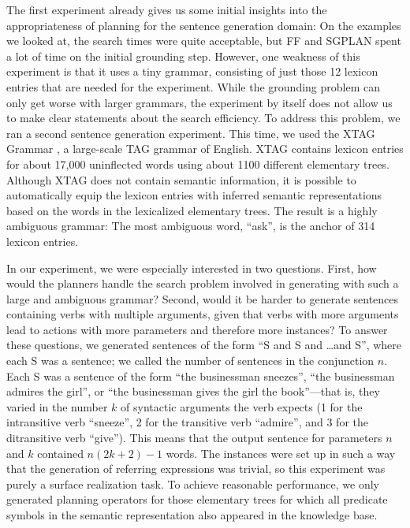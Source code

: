 The first experiment already gives us some initial insights into the
appropriateness of planning for the sentence generation domain: On the
examples we looked at, the search times were quite acceptable, but FF
and SGPLAN spent a lot of time on the initial grounding step.
However, one weakness of this experiment is that it uses a tiny
grammar, consisting of just those 12 lexicon entries that are needed
for the experiment. While the grounding problem can only get worse
with larger grammars, the experiment by itself does not allow us to
make clear statements about the search efficiency.
To address this problem, we ran a second sentence generation
experiment. This time, we used the XTAG Grammar \citep{xtag01:_tr}, a
large-scale TAG grammar of English. XTAG contains lexicon entries for
about 17,000 uninflected words using about 1100 different elementary
trees. Although XTAG does not contain semantic information, it is
possible to automatically equip the lexicon entries with inferred
semantic representations based on the words in the lexicalized
elementary trees. The result is a highly ambiguous grammar: The most
ambiguous word, ``ask'', is the anchor of 314 lexicon entries.

In our experiment, we were especially interested in two
questions. First, how would the planners handle the search problem
involved in generating with such a large and ambiguous grammar?
Second, would it be harder to generate sentences containing verbs with
multiple arguments, given that verbs with more arguments lead to
actions with more parameters and therefore more instances? To answer
these questions, we generated sentences of the form ``S and S and
\ldots and S'', where each S was a sentence; we called the number of
sentences in the conjunction $n$. Each S was a sentence of the form
``the businessman sneezes'', ``the businessman admires the girl'', or
``the businessman gives the girl the book''---that is, they varied in
the number $k$ of syntactic arguments the verb expects (1 for the
intransitive verb ``sneeze'', 2 for the transitive verb ``admire'',
and 3 for the ditransitive verb ``give''). This means that the output
sentence for parameters $n$ and $k$ contained $n(2k+2)-1$ words. The
instances were set up in such a way that the generation of referring
expressions was trivial, so this experiment was purely a surface
realization task. To achieve reasonable performance, we only generated
planning operators for those elementary trees for which all predicate
symbols in the semantic representation also appeared in the knowledge
base.

